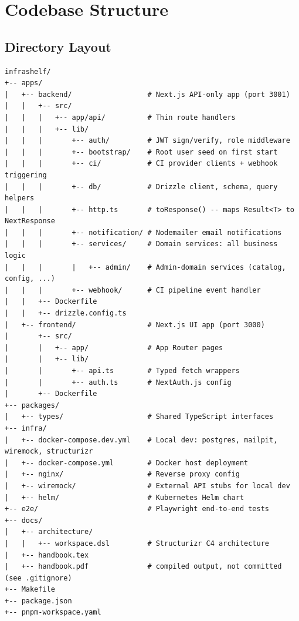 \documentclass[12pt,a4paper,twoside]{report}
\begin{document}
\chapter{Codebase Structure}
\label{ch:codebase}

\section{Directory Layout}

\begin{lstlisting}
infrashelf/
+-- apps/
|   +-- backend/                  # Next.js API-only app (port 3001)
|   |   +-- src/
|   |   |   +-- app/api/          # Thin route handlers
|   |   |   +-- lib/
|   |   |       +-- auth/         # JWT sign/verify, role middleware
|   |   |       +-- bootstrap/    # Root user seed on first start
|   |   |       +-- ci/           # CI provider clients + webhook triggering
|   |   |       +-- db/           # Drizzle client, schema, query helpers
|   |   |       +-- http.ts       # toResponse() -- maps Result<T> to NextResponse
|   |   |       +-- notification/ # Nodemailer email notifications
|   |   |       +-- services/     # Domain services: all business logic
|   |   |       |   +-- admin/    # Admin-domain services (catalog, config, ...)
|   |   |       +-- webhook/      # CI pipeline event handler
|   |   +-- Dockerfile
|   |   +-- drizzle.config.ts
|   +-- frontend/                 # Next.js UI app (port 3000)
|       +-- src/
|       |   +-- app/              # App Router pages
|       |   +-- lib/
|       |       +-- api.ts        # Typed fetch wrappers
|       |       +-- auth.ts       # NextAuth.js config
|       +-- Dockerfile
+-- packages/
|   +-- types/                    # Shared TypeScript interfaces
+-- infra/
|   +-- docker-compose.dev.yml    # Local dev: postgres, mailpit, wiremock, structurizr
|   +-- docker-compose.yml        # Docker host deployment
|   +-- nginx/                    # Reverse proxy config
|   +-- wiremock/                 # External API stubs for local dev
|   +-- helm/                     # Kubernetes Helm chart
+-- e2e/                          # Playwright end-to-end tests
+-- docs/
|   +-- architecture/
|   |   +-- workspace.dsl         # Structurizr C4 architecture
|   +-- handbook.tex
|   +-- handbook.pdf              # compiled output, not committed (see .gitignore)
+-- Makefile
+-- package.json
+-- pnpm-workspace.yaml
\end{lstlisting}
\end{document}
